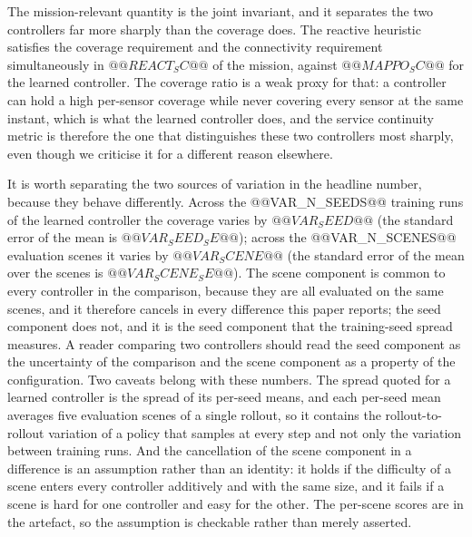 The mission-relevant quantity is the joint invariant, and it separates
the two controllers far more sharply than the coverage does.  The
reactive heuristic satisfies the coverage requirement and the connectivity requirement simultaneously in $@@REACT_SC@@$ of the
mission, against $@@MAPPO_SC@@$ for the learned controller.  The
coverage ratio is a weak proxy for that: a controller can hold a high
per-sensor coverage while never covering every sensor at the same
instant, which is what the learned controller does, and the service
continuity metric is therefore the one that distinguishes these two
controllers most sharply, even though we criticise it for a different
reason elsewhere.

It is worth separating the two sources of variation in the headline
number, because they behave differently.  Across the @@VAR_N_SEEDS@@
training runs of the learned controller the coverage varies by $@@VAR_SEED@@$
(the standard error of the mean is $@@VAR_SEED_SE@@$); across the
@@VAR_N_SCENES@@ evaluation scenes it varies by $@@VAR_SCENE@@$ (the
standard error of the mean over the scenes is $@@VAR_SCENE_SE@@$).  The
scene component is common to every controller in the comparison, because
they are all evaluated on the same scenes, and it therefore cancels in
every difference this paper reports; the seed component does not, and it
is the seed component that the training-seed spread measures.  A reader
comparing two controllers should read the seed component as the
uncertainty of the comparison and the scene component as a property of the
configuration.  Two caveats belong with these numbers.  The spread
quoted for a learned controller is the spread of its per-seed means,
and each per-seed mean averages five evaluation scenes of a single
rollout, so it contains the rollout-to-rollout variation of a policy
that samples at every step and not only the variation between training
runs.  And the cancellation of the scene component in a difference is an
assumption rather than an identity: it holds if the difficulty of a
scene enters every controller additively and with the same size, and
it fails if a scene is hard for one controller and easy for the other.
The per-scene scores are in the artefact, so the assumption is
checkable rather than merely asserted.

